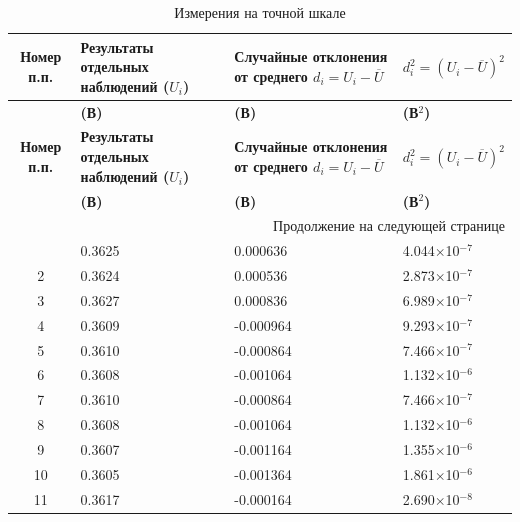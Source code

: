 \clearpage
\begin{longtable}{|c|p{3.2cm}|p{3.5cm}|p{3.5cm}|}
\caption{Измерения на точной шкале}
\label{tabl:2}\\
\hline
\textbf{Номер п.п.} & \textbf{Результаты отдельных наблюдений ($U_i$)} & \textbf{Случайные отклонения от среднего $d_i = U_i - \overline{U}$} & \textbf{$d_i^2 = (U_i - \overline{U})^2$} \\
\hline
 & \textbf{(В)} & \textbf{(В)} & \textbf{(В\(^2\))} \\
\hline
\endfirsthead

\hline
\textbf{Номер п.п.} & \textbf{Результаты отдельных наблюдений ($U_i$)} & \textbf{Случайные отклонения от среднего $d_i = U_i - \overline{U}$} & \textbf{$d_i^2 = (U_i - \overline{U})^2$} \\
\hline
 & \textbf{(В)} & \textbf{(В)} & \textbf{(В\(^2\))} \\
\hline
\endhead

\hline
\multicolumn{4}{|r|}{Продолжение на следующей странице} \\
\endfoot

\hline
\endlastfoot
1  & 0.3625 & 0.000636 & 4.044$\times$10$^{-7}$ \\

2  & 0.3624 & 0.000536 & 2.873$\times$10$^{-7}$ \\

3  & 0.3627 & 0.000836 & 6.989$\times$10$^{-7}$ \\

4  & 0.3609 & -0.000964 & 9.293$\times$10$^{-7}$ \\

5  & 0.3610 & -0.000864 & 7.466$\times$10$^{-7}$ \\

6  & 0.3608 & -0.001064 & 1.132$\times$10$^{-6}$ \\

7  & 0.3610 & -0.000864 & 7.466$\times$10$^{-7}$ \\

8  & 0.3608 & -0.001064 & 1.132$\times$10$^{-6}$ \\

9  & 0.3607 & -0.001164 & 1.355$\times$10$^{-6}$ \\

10 & 0.3605 & -0.001364 & 1.861$\times$10$^{-6}$ \\

11 & 0.3617 & -0.000164 & 2.690$\times$10$^{-8}$ \\


\end{longtable}
